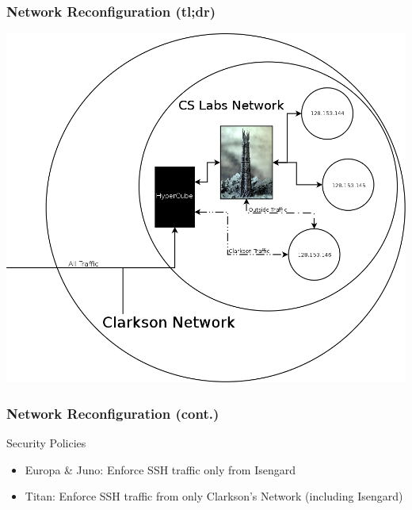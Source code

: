 \documentclass{beamer}
\begin{document}
\begin{frame}
  \frametitle{Network Reconfiguration (tl;dr)} 
  \includegraphics[height=\textheight]{diagrams/network.png}
\end{frame}

\begin{frame}
  \frametitle{Network Reconfiguration (cont.)}
Security Policies
  \begin{itemize}
      \item Europa \& Juno: Enforce SSH traffic only from Isengard
      \item Titan: Enforce SSH traffic from only Clarkson's Network (including Isengard)
  \end{itemize}
\end{frame}
\end{document}
